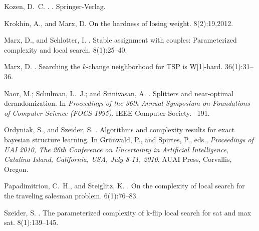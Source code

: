 \documentclass[10pt,usletter]{article}
\begin{document}
{\begin{thebibliography}{}
Kozen, D.~C.
.
.
\newblock Springer-Verlag.

Krokhin, A., and Marx, D.
\newblock On the hardness of losing weight.
 8(2):19,2012.

Marx, D., and Schlotter, I.
.
\newblock Stable assignment with couples: Parameterized complexity and local
  search.
 8(1):25--40.

Marx, D.
.
\newblock Searching the {$k$}-change neighborhood for {TSP} is {W}[1]-hard.
 36(1):31--36.

Naor, M.; Schulman, L.~J.; and Srinivasan, A.
.
\newblock Splitters and near-optimal derandomization.
\newblock In {\em Proceedings of the 36th Annual Symposium on Foundations of
  Computer Science (FOCS 1995)}. IEEE Computer Society.
--191.





Ordyniak, S., and Szeider, S.
.
\newblock Algorithms and complexity results for exact bayesian structure
  learning.
\newblock In Gr\"{u}nwald, P., and Spirtes, P., eds., {\em Proceedings of UAI
  2010, The 26th Conference on Uncertainty in Artificial Intelligence, Catalina
  Island, California, USA, July 8-11, 2010}.
\newblock AUAI Press, Corvallis, Oregon.

\balance

Papadimitriou, C.~H., and Steiglitz, K.
.
\newblock On the complexity of local search for the traveling salesman problem.
 6(1):76--83.

Szeider, S.
.
\newblock The parameterized complexity of k-flip local search for sat and max
  sat.
 8(1):139--145.

\end{thebibliography}



}
\end{document}
